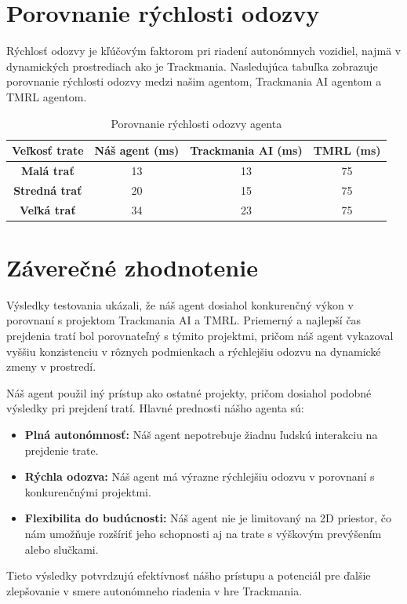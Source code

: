 \section{Porovnanie rýchlosti odozvy}
\label{sec:odozva}

Rýchlosť odozvy je kľúčovým faktorom pri riadení autonómnych vozidiel, najmä v dynamických prostrediach ako je Trackmania. Nasledujúca tabuľka zobrazuje porovnanie rýchlosti odozvy medzi našim agentom, Trackmania AI agentom a TMRL agentom.

\begin{table}[h]
\centering
\begin{tabular}{|c|c|c|c|}
\hline
\textbf{Veľkosť trate} & \textbf{Náš agent (ms)} & \textbf{Trackmania AI (ms)} & \textbf{TMRL (ms)} \\ \hline
\textbf{Malá trať} & 13 & 13 & 75 \\ \hline
\textbf{Stredná trať} & 20 & 15 & 75 \\ \hline
\textbf{Veľká trať} & 34 & 23 & 75 \\ \hline
\end{tabular}
\caption{Porovnanie rýchlosti odozvy agenta}
\label{tab:odozva}
\end{table}

\section{Záverečné zhodnotenie}
\label{sec:zaver}

Výsledky testovania ukázali, že náš agent dosiahol konkurenčný výkon v porovnaní s projektom Trackmania AI a TMRL. Priemerný a najlepší čas prejdenia tratí bol porovnateľný s týmito projektmi, pričom náš agent vykazoval vyššiu konzistenciu v rôznych podmienkach a rýchlejšiu odozvu na dynamické zmeny v prostredí.

Náš agent použil iný prístup ako ostatné projekty, pričom dosiahol podobné výsledky pri prejdení tratí. Hlavné prednosti nášho agenta sú:

\begin{itemize}
    \item \textbf{Plná autonómnosť:} Náš agent nepotrebuje žiadnu ľudskú interakciu na prejdenie trate.
    \item \textbf{Rýchla odozva:} Náš agent má výrazne rýchlejšiu odozvu v porovnaní s konkurenčnými projektmi.
    \item \textbf{Flexibilita do budúcnosti:} Náš agent nie je limitovaný na 2D priestor, čo nám umožňuje rozšíriť jeho schopnosti aj na trate s výškovým prevýšením alebo slučkami.
\end{itemize}

Tieto výsledky potvrdzujú efektívnosť nášho prístupu a potenciál pre ďalšie zlepšovanie v smere autonómneho riadenia v hre Trackmania.
